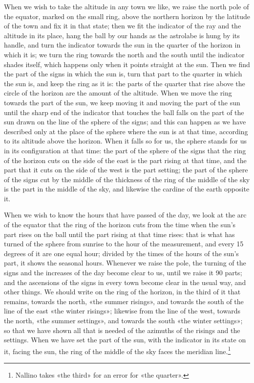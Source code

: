 \documentclass[11pt]{article}
\newcommand{\ArPage}[1]{\marginpar{\footnotesize\color{gray}Ar.\,p.\,#1}}
\begin{document}
\par \ArPage{214}When we wish to take the altitude in any town we like, we raise the north pole of the equator, marked on the small ring, above the northern horizon by the latitude of the town and fix it in that state; then we fit the indicator of the ray and the altitude in its place, hang the ball by our hands as the astrolabe is hung by its handle, and turn the indicator towards the sun in the quarter of the horizon in which it is; we turn the ring towards the north and the south until the indicator shades itself, which happens only when it points straight at the sun. Then we find the part of the signs in which the sun is, turn that part to the quarter in which the sun is, and keep the ring as it is: the parts of the quarter that rise above the circle of the horizon are the amount of the altitude. When we move the ring towards the part of the sun, we keep moving it and moving the part of the sun until the sharp end of the indicator that touches the ball falls on the part of the sun drawn on the line of the sphere of the signs; and this can happen as we have described only at the place of the sphere where the sun is at that time, according to its altitude above the horizon. When it falls so for us, the sphere stands for us in its configuration at that time: the part of the sphere of the signs that the ring of the horizon cuts on the side of the east is the part rising at that time, and the part that it cuts on the side of the west is the part setting; the part of the sphere of the signs cut by the middle of the thickness of the ring of the middle of the sky is the part in the middle of the sky, and likewise the cardine of the earth opposite it.\par
\par When we wish to know the hours that have passed of the day, we look at the arc of the equator that the ring of the horizon cuts from the time when the sun's part rises on the ball until the part rising at that time rises: that is what has turned of the sphere from sunrise to the hour of the measurement, and every 15 degrees of it are one equal hour; divided by the times of the hours of the sun's part, it shows the seasonal hours. Whenever we raise the pole, the turning of the signs and the increases of the day become clear to us, until we raise it 90 parts; and the ascensions of the signs in every town become clear in the usual way, and other things. We should write on the ring of the horizon, in the third of it that remains, towards the north, «the summer risings», and towards the south of the line of the east «the winter risings»; likewise from the line of the west, towards the north, «the summer settings», and towards the south «the winter settings»; so that we have shown all that is needed of the azimuths of the risings and the settings. When we have set the part of the sun, with the indicator in its state on it, facing the sun, the ring of the middle of the sky faces the meridian line.\footnote{Nallino takes «the third» for an error for «the quarter».}\par
\end{document}
